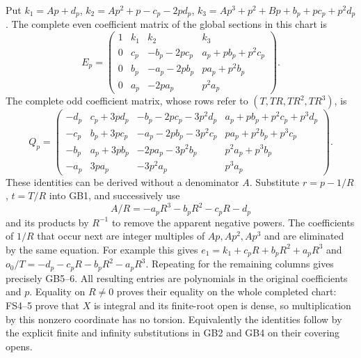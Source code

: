 \documentclass[11pt]{article}
\begin{document}
Put
$k_1=Ap+d_p$,
$k_2=Ap^2+p-c_p-2pd_p$,
$k_3=Ap^3+p^2+Bp+b_p+pc_p+p^2d_p$.
The complete even coefficient matrix of the global sections
in this chart is
\begin{equation}
 E_p=\begin{pmatrix}
 1&k_1&k_2&k_3\\
 0&c_p&-b_p-2pc_p&a_p+pb_p+p^2c_p\\
 0&b_p&-a_p-2pb_p&pa_p+p^2b_p\\
 0&a_p&-2pa_p&p^2a_p
 \end{pmatrix}.
 \tag{GB5}
\end{equation}
The complete odd coefficient matrix, whose rows refer to
$(T,TR,TR^2,TR^3)$, is
\begin{equation}
 Q_p=\begin{pmatrix}
 -d_p&c_p+3pd_p&-b_p-2pc_p-3p^2d_p&
                        a_p+pb_p+p^2c_p+p^3d_p\\
 -c_p&b_p+3pc_p&-a_p-2pb_p-3p^2c_p&
                        pa_p+p^2b_p+p^3c_p\\
 -b_p&a_p+3pb_p&-2pa_p-3p^2b_p&
                        p^2a_p+p^3b_p\\
 -a_p&3pa_p&-3p^2a_p&p^3a_p
 \end{pmatrix}.
 \tag{GB6}
\end{equation}
These identities can be derived without a denominator $A$.
Substitute $r=p-1/R$, $t=T/R$ into GB1, and successively use
\[
 A/R=-a_pR^3-b_pR^2-c_pR-d_p
\]
and its products by $R^{-1}$ to remove the apparent negative
powers. The coefficients of $1/R$ that occur next are
integer multiples of $Ap,Ap^2,Ap^3$ and are eliminated by
the same equation. For example this gives
$e_1=k_1+c_pR+b_pR^2+a_pR^3$ and
$o_0/T=-d_p-c_pR-b_pR^2-a_pR^3$.
Repeating for the remaining columns gives precisely GB5--6.
All resulting entries are polynomials in the original
coefficients and $p$. Equality on $R\ne0$ proves their equality
on the whole completed chart: FS4--5 prove that $X$ is
integral and its finite-root open is dense, so multiplication
by this nonzero coordinate has no torsion. Equivalently the
identities follow by the explicit finite and infinity
substitutions in GB2 and GB4 on their covering opens.
\end{document}
